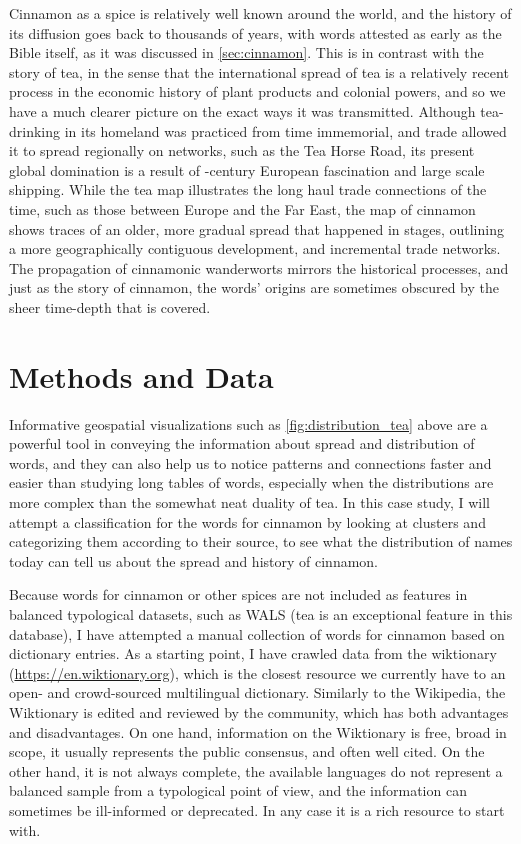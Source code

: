 Cinnamon as a spice is relatively well known around the world, and the history of its diffusion goes back to thousands of years, with words attested as early as the Bible itself, as it was discussed in \cref{sec:cinnamon}. This is in contrast with the story of tea, in the sense that the international spread of tea is a relatively recent process in the economic history of plant products and colonial powers, and so we have a much clearer picture on the exact ways it was transmitted. Although tea-drinking in its homeland was practiced from time immemorial, and trade allowed it to spread regionally on networks, such as the Tea Horse Road, its present global domination is a result of -century European fascination and large scale shipping. While the tea map illustrates the long haul trade connections of the time, such as those between Europe and the Far East, the map of cinnamon shows traces of an older, more gradual spread that happened in stages, outlining a more geographically contiguous development, and incremental trade networks. The propagation of cinnamonic \glspl{wanderwort} mirrors the historical processes, and just as the story of cinnamon, the words' origins are sometimes obscured by the sheer time-depth that is covered.

\section{Methods and Data}

Informative geospatial visualizations such as \cref{fig:distribution_tea} above are a powerful tool in conveying the information about spread and distribution of words, and they can also help us to notice patterns and connections faster and easier than studying long tables of words, especially when the distributions are more complex than the somewhat neat duality of tea. In this case study, I will attempt a classification for the words for cinnamon by looking at clusters and categorizing them according to their source, to see what the distribution of names today can tell us about the spread and history of cinnamon.

Because words for cinnamon or other spices are not included as features in balanced typological datasets, such as \gls{WALS} (tea is an exceptional feature in this database), I have attempted a manual collection of words for cinnamon based on dictionary entries. As a starting point, I have crawled data from the \gls{wiktionary} (\url{https://en.wiktionary.org}), which is the closest resource we currently have to an open- and crowd-sourced multilingual dictionary. Similarly to the Wikipedia, the Wiktionary is edited and reviewed by the community, which has both advantages and disadvantages. On one hand, information on the Wiktionary is free, broad in scope, it usually represents the public consensus, and often well cited. On the other hand, it is not always complete, the available languages do not represent a balanced sample from a typological point of view, and the information can sometimes be ill-informed or deprecated. In any case it is a rich resource to start with. 

